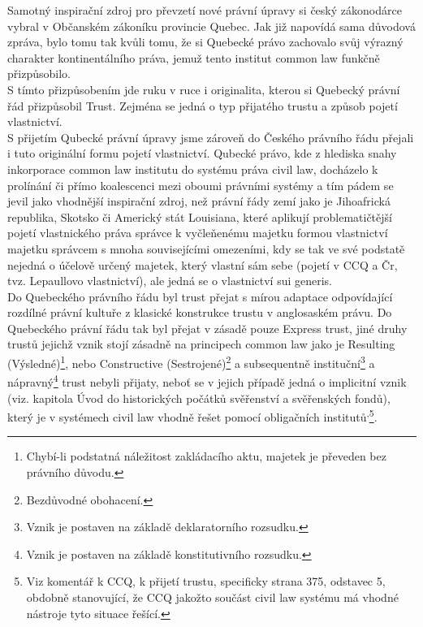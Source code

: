 \documentclass{article}
\begin{document}
Samotný inspirační zdroj pro převzetí nové právní úpravy si český zákonodárce vybral v Občanském zákoníku provincie Quebec. Jak již napovídá sama důvodová zpráva, bylo tomu tak kvůli tomu, že si Quebecké právo zachovalo svůj výrazný charakter kontinentálního práva, jemuž tento institut common law funkčně přizpůsobilo.\\

S tímto přizpůsobením jde ruku v ruce i originalita, kterou si Quebecký právní řád přizpůsobil Trust. Zejména se jedná o typ přijatého trustu a způsob pojetí vlastnictví.\\

S přijetím Qubecké právní úpravy jsme zároveň do Českého právního řádu přejali i tuto originální formu pojetí vlastnictví. Qubecké právo, kde z hlediska snahy inkorporace common law institutu do systému práva civil law, docházelo k prolínání či přímo koalescenci mezi oboumi právními systémy a tím pádem se jevil jako vhodnější inspirační zdroj, než právní řády zemí jako je Jihoafrická republika, Skotsko či Americký stát Louisiana, které aplikují problematičtější pojetí vlastnického práva správce k vyčleňenému majetku formou vlastnictví majetku správcem s mnoha souvisejícími omezeními, kdy se tak ve své podstatě nejedná o účelově určený majetek, který vlastní sám sebe (pojetí v CCQ a Čr, tvz. Lepaullovo vlastnictví), ale jedná se o vlastnictví sui generis.\\


Do Quebeckého právního řádu byl trust přejat s mírou adaptace odpovídající rozdílné právní kultuře z klasické konstrukce trustu v anglosaském právu. Do Quebeckého právní řádu tak byl přejat v zásadě pouze Express trust, jiné druhy trustů jejichž vznik stojí zásadně na principech common law jako je Resulting (Výsledné)\footnote{Chybí-li podstatná náležitost zakládacího aktu, majetek je převeden bez právního důvodu.}, nebo Constructive (Sestrojené)\footnote{Bezdůvodné obohacení.} a subsequentně instituční\footnote{Vznik je postaven na základě deklaratorního rozsudku.} a nápravný\footnote{Vznik je postaven na základě konstitutivního rozsudku.} trust nebyli přijaty, neboť se v jejich případě jedná o implicitní vznik (viz. kapitola Úvod do historických počátků svěřenství a svěřenských fondů), který je v systémech civil law vhodně řešet pomocí obligačních institutů\textsuperscript{,}\footnote{Viz komentář k CCQ, k přijetí trustu, specificky strana 375, odstavec 5, obdobně stanovující, že CCQ jakožto součást civil law systému má vhodné nástroje tyto situace řešící.}.\\
\end{document}
